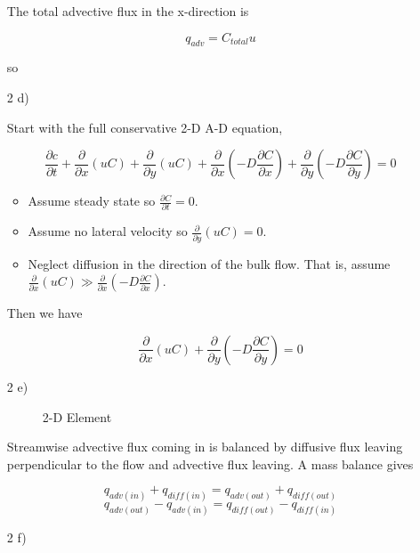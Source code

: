 \documentclass[11pt]{article}
\newcommand{\ansbox}[1]{%
	\begin{center}
		\tikz{\node[draw,rectangle]{%
			$\displaystyle#1$};}
	\end{center}
}
\newcommand{\p}[2]{\frac{\partial#1}{\partial#2}}
\begin{document}
\begin{enumerate}
The total advective flux in the x-direction is 

$$q_{adv}=C_{total}u$$ 

so

\ansbox{q_{adv}=\dot{M}}

\item[2 d)]

Start with the full conservative 2-D A-D equation, 

$$\p{c}{t}+\p{}{x}(uC)+\p{}{y}(uC)+\p{}{x}\left(-D\p{C}{x}\right)+\p{}{y}\left(-D\p{C}{y}\right)=0$$

\begin{itemize}
\item Assume steady state so $\p{C}{t}=0$.
\item Assume no lateral velocity so $\p{}{y}(uC)=0$.
\item Neglect diffusion in the direction of the bulk flow. That is, assume $\p{}{x}(uC) \gg \p{}{x}\left(-D\p{C}{x}\right)$.
\end{itemize}

Then we have 

$$\p{}{x}(uC)+\p{}{y}\left(-D\p{C}{y}\right)=0$$

\clearpage
\item[2 e)]
~
\begin{figure}[!h]
\centering
\caption{2-D Element}
\end{figure}

Streamwise advective flux coming in is balanced by diffusive flux leaving perpendicular to the flow and advective flux leaving. A mass balance gives

$$q_{adv(in)} + q_{diff(in)} = q_{adv(out)} + q_{diff(out)}$$
$$q_{adv(out)} - q_{adv(in)} = q_{diff(out)} - q_{diff(in)}$$

\item[2 f)]~


\end{enumerate}
\end{document}
